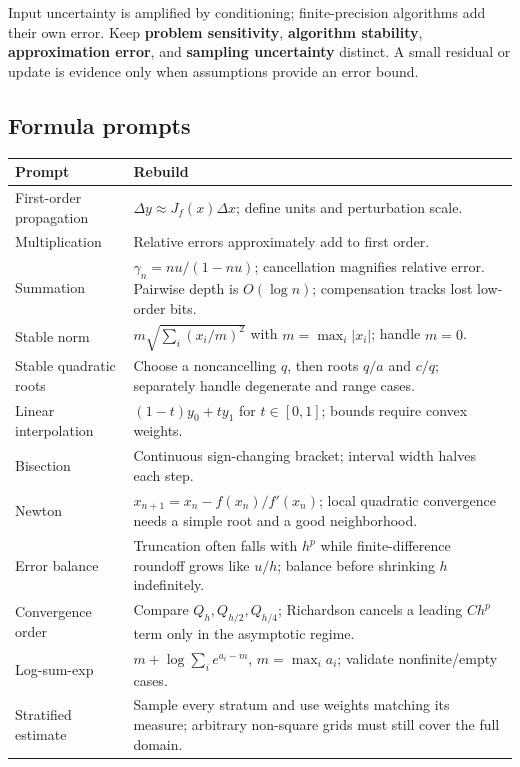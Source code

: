 Input uncertainty is amplified by conditioning; finite-precision algorithms add their own error. Keep \textbf{problem sensitivity}, \textbf{algorithm stability}, \textbf{approximation error}, and \textbf{sampling uncertainty} distinct. A small residual or update is evidence only when assumptions provide an error bound.

\subsection{Formula prompts}\label{appendix-cb5af353ef77-formula-prompts-1}

{\def\LTcaptype{none} %
\begin{longtable}[]{@{}
  >{\raggedright\arraybackslash}p{}
  >{\raggedright\arraybackslash}p{}@{}}
\toprule\noalign{}
\begin{minipage}[b]{\linewidth}\raggedright
Prompt
\end{minipage} & \begin{minipage}[b]{\linewidth}\raggedright
Rebuild
\end{minipage} \\
\midrule\noalign{}
\endhead
\bottomrule\noalign{}
\endlastfoot
First-order propagation & \(\Delta y\approx J_f(x)\Delta x\); define units and perturbation scale. \\
Multiplication & Relative errors approximately add to first order. \\
Summation & \(\gamma_n=nu/(1-nu)\); cancellation magnifies relative error. Pairwise depth is \(O(\log n)\); compensation tracks lost low-order bits. \\
Stable norm & \(m\sqrt{\sum_i(x_i/m)^2}\) with \(m=\max_i|x_i|\); handle \(m=0\). \\
Stable quadratic roots & Choose a noncancelling \(q\), then roots \(q/a\) and \(c/q\); separately handle degenerate and range cases. \\
Linear interpolation & \((1-t)y_0+ty_1\) for \(t\in[0,1]\); bounds require convex weights. \\
Bisection & Continuous sign-changing bracket; interval width halves each step. \\
Newton & \(x_{n+1}=x_n-f(x_n)/f'(x_n)\); local quadratic convergence needs a simple root and a good neighborhood. \\
Error balance & Truncation often falls with \(h^p\) while finite-difference roundoff grows like \(u/h\); balance before shrinking \(h\) indefinitely. \\
Convergence order & Compare \(Q_h,Q_{h/2},Q_{h/4}\); Richardson cancels a leading \(Ch^p\) term only in the asymptotic regime. \\
Log-sum-exp & \(m+\log\sum_i e^{a_i-m}\), \(m=\max_i a_i\); validate nonfinite/empty cases. \\
Stratified estimate & Sample every stratum and use weights matching its measure; arbitrary non-square grids must still cover the full domain. \\
\end{longtable}
}

